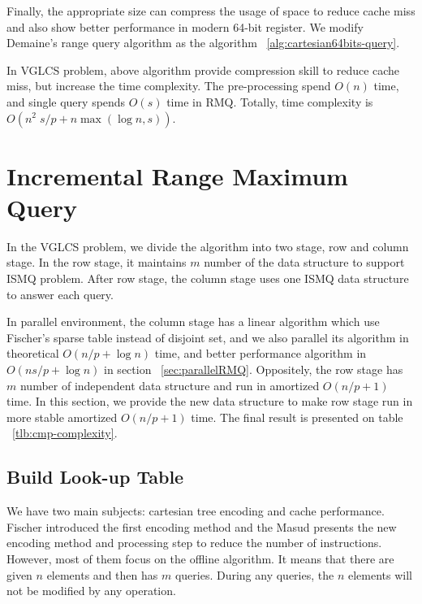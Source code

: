 Finally, the appropriate size can compress the usage of space to
reduce cache miss and also show better performance in modern 64-bit
register.  We modify Demaine's range query algorithm as the algorithm
~\ref{alg:cartesian64bits-query}.





In VGLCS problem, above algorithm provide compression skill to reduce
cache miss, but increase the time complexity.  The pre-processing
spend $O(n)$ time, and single query spends $O(s)$ time in RMQ.
Totally, time complexity is $O(n^2 \; s / p + n \max(\log n, s))$.



\section{Incremental Range Maximum Query}

In the VGLCS problem, we divide the algorithm into two stage, row and
column stage.  In the row stage, it maintains $m$ number of the data
structure to support ISMQ problem.  After row stage, the column stage
uses one ISMQ data structure to answer each query.

In parallel environment, the column stage has a linear algorithm which
use Fischer's sparse table instead of disjoint set, and we also
parallel its algorithm in theoretical $O(n / p + \log n)$ time, and
better performance algorithm in $O(n s / p + \log n)$ in section
~\ref{sec:parallelRMQ}.  Oppositely, the row stage has $m$ number of
independent data structure and run in amortized $O(n / p + 1)$ time.
In this section, we provide the new data structure to make row stage
run in more stable amortized $O(n / p + 1)$ time.   The final result
is presented on table ~\ref{tlb:cmp-complexity}.



\subsection{Build Look-up Table}

We have two main subjects: cartesian tree encoding and cache
performance.  Fischer introduced the first encoding method and the
Masud presents the new encoding method and processing step to reduce
the number of instructions.  However, most of them focus on the
offline algorithm.  It means that there are given $n$ elements and
then has $m$ queries.  During any queries, the $n$ elements will not
be modified by any operation.

